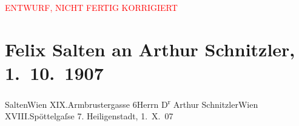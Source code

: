 
\begin{center}
            \textcolor{red}{ENTWURF, NICHT FERTIG KORRIGIERT}
                      \end{center}
            
         
         \renewcommand{\erwaehntePersonen}{Personen: Ferdinand von Fellner-Feldegg}
         \renewcommand{\erwaehnteInstitutionen}{Institutionen: Lessing-Theater}
         \renewcommand{\erwaehnteOrte}{Orte: Armbrustergasse, Berlin, Edmund-Weiß-Gasse, Heiligenstadt, I., Innere Stadt, Raimund-Theater, Wien, XIX., Döbling, XVIII., Währing}
         \renewcommand{\erwaehnteWerke}{Werke: Mit seinem Gotte allein. Volksschauspiel in 4 Aufzügen, Vom andern Ufer. Einakter}
               \section[Felix Salten an Arthur Schnitzler, 1. 10. 1907]{ Felix Salten an Arthur Schnitzler, 1. 10. 1907}\nopagebreak{}\rehead{ }\begin{ledgroupsized}[t]{13cm}\normalsize\beginnumbering \toendnotes[C]{\smallbreak\pagebreak[2]} 
\toendnotes[C]{\smallbreak}\pstart{}{\pb}Salten\pend{}\pstart{}Wien XIX.\pend{}\pstart{}Armbrustergasse 6\pend{}{\bigskip}\pstart{}Herrn D\textsuperscript{r} Arthur Schnitzler\pend{}\pstart{}Wien XVIII.\pend{}\pstart{}Spöttelgaſse 7.\pend{}{\bigskip}\pstart
           \raggedleft{}{\pb}Heiligenstadt, 1. X. 07\pend
           \pstart

\end{ledgroupsized}
